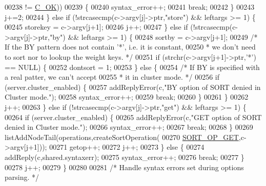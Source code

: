 \begin{DoxyCode}
00238                  != \hyperlink{server_8h_a303769ef1065076e68731584e758d3e1}{C\_OK}))
00239             \{
00240                 syntax\_error++;
00241                 \textcolor{keywordflow}{break};
00242             \}
00243             j+=2;
00244         \} \textcolor{keywordflow}{else} \textcolor{keywordflow}{if} (!strcasecmp(c->argv[j]->ptr,\textcolor{stringliteral}{"store"}) && leftargs >= 1) \{
00245             storekey = c->argv[j+1];
00246             j++;
00247         \} \textcolor{keywordflow}{else} \textcolor{keywordflow}{if} (!strcasecmp(c->argv[j]->ptr,\textcolor{stringliteral}{"by"}) && leftargs >= 1) \{
00248             sortby = c->argv[j+1];
00249             \textcolor{comment}{/* If the BY pattern does not contain '*', i.e. it is constant,}
00250 \textcolor{comment}{             * we don't need to sort nor to lookup the weight keys. */}
00251             \textcolor{keywordflow}{if} (strchr(c->argv[j+1]->ptr,\textcolor{stringliteral}{'*'}) == NULL) \{
00252                 dontsort = 1;
00253             \} \textcolor{keywordflow}{else} \{
00254                 \textcolor{comment}{/* If BY is specified with a real patter, we can't accept}
00255 \textcolor{comment}{                 * it in cluster mode. */}
00256                 \textcolor{keywordflow}{if} (server.cluster\_enabled) \{
00257                     addReplyError(c,\textcolor{stringliteral}{"BY option of SORT denied in Cluster mode."});
00258                     syntax\_error++;
00259                     \textcolor{keywordflow}{break};
00260                 \}
00261             \}
00262             j++;
00263         \} \textcolor{keywordflow}{else} \textcolor{keywordflow}{if} (!strcasecmp(c->argv[j]->ptr,\textcolor{stringliteral}{"get"}) && leftargs >= 1) \{
00264             \textcolor{keywordflow}{if} (server.cluster\_enabled) \{
00265                 addReplyError(c,\textcolor{stringliteral}{"GET option of SORT denied in Cluster mode."});
00266                 syntax\_error++;
00267                 \textcolor{keywordflow}{break};
00268             \}
00269             listAddNodeTail(operations,createSortOperation(
00270                 \hyperlink{server_8h_ae9b61d5c032be6ac2f29076ee43cef8b}{SORT\_OP\_GET},c->argv[j+1]));
00271             getop++;
00272             j++;
00273         \} \textcolor{keywordflow}{else} \{
00274             addReply(c,shared.syntaxerr);
00275             syntax\_error++;
00276             \textcolor{keywordflow}{break};
00277         \}
00278         j++;
00279     \}
00280 
00281     \textcolor{comment}{/* Handle syntax errors set during options parsing. */}

\end{DoxyCode}
